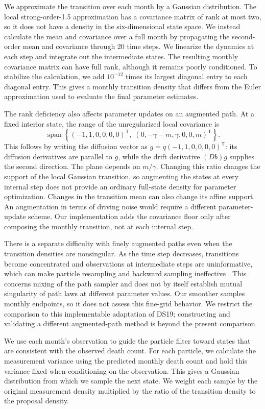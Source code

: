 \documentclass[11pt]{article}
\theoremstyle{thmstylethree}%
\begin{document}
We approximate the transition over each month by a Gaussian distribution.
The local strong-order-1.5 approximation has a covariance matrix of rank
at most two, so it does not have a density in the six-dimensional state
space. We instead calculate the mean and covariance over a full month by
propagating the second-order mean and covariance through 20 time steps.
We linearize the dynamics at each step and integrate out the intermediate
states. The resulting monthly covariance matrix can have full rank,
although it remains poorly conditioned. To stabilize the calculation,
we add $10^{-12}$ times its largest diagonal entry to each diagonal entry.
This gives a monthly transition density that differs from the Euler
approximation used to evaluate the final parameter estimates.

The rank deficiency also affects parameter updates on an augmented path.
At a fixed interior state, the range of the unregularized local covariance is
\[
 \operatorname{span}\left\{
 (-1,1,0,0,0,0)^{\mathsf T},\;
 (0,-\gamma-m,\gamma,0,0,m)^{\mathsf T}
 \right\}.
\]
This follows by writing the diffusion vector as $g=q(-1,1,0,0,0,0)^{\mathsf T}$:
its diffusion derivatives are parallel to $g$, while the drift derivative
$(Db)g$ supplies the second direction. The plane depends on $m/\gamma$.
Changing this ratio changes the support of the local Gaussian transition,
so augmenting the states at every internal step does not provide an
ordinary full-state density for parameter optimization. Changes in the
transition mean can also change its affine support. An augmentation in
terms of driving noise would require a different parameter-update scheme.
Our implementation adds the covariance floor only after composing the
monthly transition, not at each internal step.

There is a separate difficulty with finely augmented paths even when the
transition densities are nonsingular. As the time step decreases, transitions
become concentrated and observations at intermediate steps are uninformative,
which can make particle resampling and backward sampling ineffective
\citep{karppinen24}. This concerns mixing of the path sampler and does not
by itself establish mutual singularity of path laws at different parameter
values. Our smoother samples monthly endpoints, so it does not assess
this fine-grid behavior. We restrict the comparison to this implementable
adaptation of DS19; constructing and validating a different augmented-path
method is beyond the present comparison.

We use each month's observation to guide the particle filter toward states
that are consistent with the observed death count. For each particle, we
calculate the measurement variance using the predicted monthly death count
and hold this variance fixed when conditioning on the observation.
This gives a Gaussian distribution from which we sample the next state.
We weight each sample by the original measurement density multiplied by
the ratio of the transition density to the proposal density.
\end{document}
